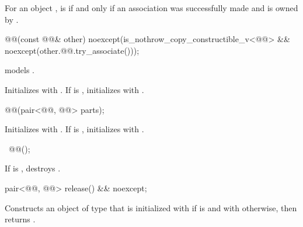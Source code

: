\pnum
For an  object ,
 is 
if and only if
an association was successfully made and is owned by .

%
\begin{itemdecl}
@@(const @@& other)
  noexcept(is_nothrow_copy_constructible_v<@@> &&
           noexcept(other.@@.try_associate()));
\end{itemdecl}

\begin{itemdescr}
\pnum
\constraints
{} models .

\pnum
\effects
Initializes  with .
If  is ,
initializes  with .
\end{itemdescr}

%
\begin{itemdecl}
@@(pair<@@, @@> parts);
\end{itemdecl}

\begin{itemdescr}
\pnum
\effects
Initializes  with .
If  is ,
initializes  with .
\end{itemdescr}

%
\begin{itemdecl}
~@@();
\end{itemdecl}

\begin{itemdescr}
\pnum
\effects
If  is , destroys .
\end{itemdescr}

%
\begin{itemdecl}
pair<@@, @@> release() && noexcept;
\end{itemdecl}

\begin{itemdescr}
\pnum
\effects
Constructs an object  of type 
that is initialized with 
if  is  and
with  otherwise,
then returns .
\end{itemdescr}

